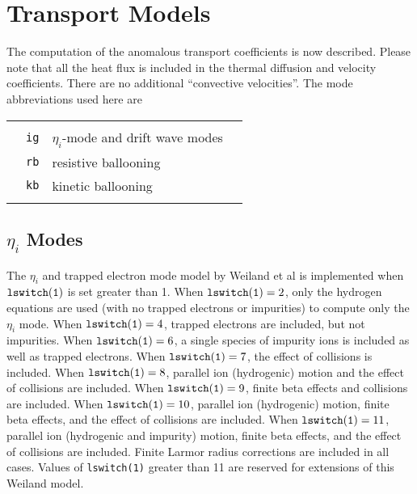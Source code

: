
\section{Transport Models}

The computation of the anomalous transport coefficients is
now described.  Please note that all the heat flux is included in the
thermal diffusion and velocity coefficients.  There are no additional
``convective velocities''.
The mode abbreviations used here are
\begin{center}
\begin{tabular}{llll}
    &             &                                         &        \\
    & {\tt ig}    & $\eta_i$-mode and drift wave modes      &        \\
    & {\tt rb}    & resistive ballooning                    &        \\
    & {\tt kb}    & kinetic ballooning                      &        \\
    &             &                                         &
\end{tabular}
\end{center}


\subsection{$\eta_i$ Modes}

The $\eta_i$ and trapped electron mode model 
by Weiland et al\cite{nord90a} is implemented when
${\tt lswitch(1)}$ is set greater than 1.
When $ {\tt lswitch(1)} = 2 $, only the hydrogen equations are used
(with no trapped electrons or impurities) to compute only the 
$ \eta_i $ mode.
When $ {\tt lswitch(1)} = 4 $, trapped electrons are included,
but not impurities.
When $ {\tt lswitch(1)} = 6 $, a single species of impurity ions is
included as well as trapped electrons.
When $ {\tt lswitch(1)} = 7 $, the effect of collisions is included.
When $ {\tt lswitch(1)} = 8 $, parallel ion (hydrogenic) motion and 
the effect of collisions are included.
When $ {\tt lswitch(1)} = 9 $, finite beta effects and collisions are
included.
When $ {\tt lswitch(1)} = 10 $, parallel ion (hydrogenic) motion, 
finite beta effects, and the effect of collisions are included.
When $ {\tt lswitch(1)} = 11 $, parallel ion (hydrogenic and impurity) motion, 
finite beta effects, and the effect of collisions are included.
Finite Larmor radius corrections are included in all cases.
Values of {\tt lswitch(1)} greater than 11 are reserved for extensions
of this Weiland model.

